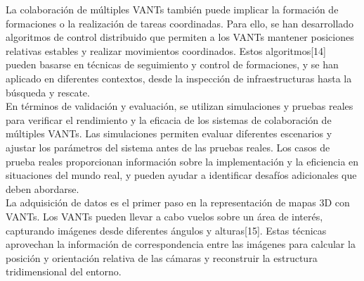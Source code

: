 \documentclass[11pt,epsf,times]{article}
\begin{document}
La colaboraci\'{o}n de m\'{u}ltiples VANTs tambi\'{e}n puede implicar la formaci\'{o}n de formaciones o la realizaci\'{o}n de tareas coordinadas. Para ello, se han desarrollado algoritmos de control distribuido que permiten a los VANTs mantener posiciones relativas estables y realizar movimientos coordinados. Estos algoritmos[14] pueden basarse en t\'{e}cnicas de seguimiento y control de formaciones, y se han aplicado en diferentes contextos, desde la inspecci\'{o}n de infraestructuras hasta la b\'{u}squeda y rescate.\\

En t\'{e}rminos de validaci\'{o}n y evaluaci\'{o}n, se utilizan simulaciones y pruebas reales para verificar el rendimiento y la eficacia de los sistemas de colaboraci\'{o}n de m\'{u}ltiples VANTs. Las simulaciones permiten evaluar diferentes escenarios y ajustar los par\'{a}metros del sistema antes de las pruebas reales. Los casos de prueba reales proporcionan informaci\'{o}n sobre la implementaci\'{o}n y la eficiencia en situaciones del mundo real, y pueden ayudar a identificar desaf\'{i}os adicionales que deben abordarse.\\




La adquisici\'{o}n de datos es el primer paso en la representaci\'{o}n de mapas 3D con VANTs. Los VANTs pueden llevar a cabo vuelos sobre un \'{a}rea de inter\'{e}s, capturando im\'{a}genes desde diferentes \'{a}ngulos y alturas[15]. Estas t\'{e}cnicas aprovechan la informaci\'{o}n de correspondencia entre las im\'{a}genes para calcular la posici\'{o}n y orientaci\'{o}n relativa de las c\'{a}maras y reconstruir la estructura tridimensional del entorno.\\
\end{document}
